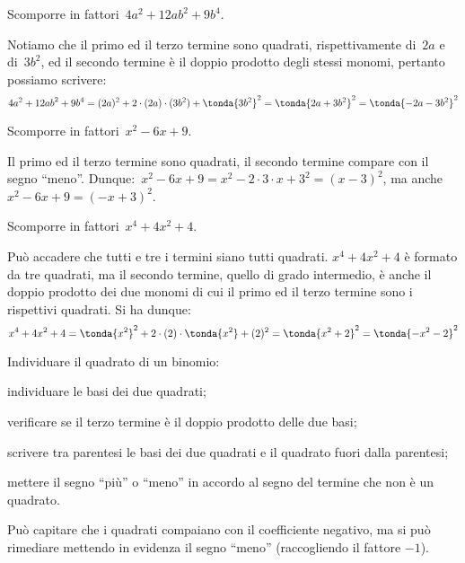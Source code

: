  \begin{esempio}
Scomporre in fattori~\(4a^{2}+12ab^{2}+9b^{4}\).

Notiamo che il primo ed il terzo termine sono quadrati, rispettivamente 
di~\(2a\) e di~\(3b^{2}\), ed il secondo termine è il doppio prodotto degli 
stessi 
monomi, pertanto possiamo scrivere:
\[4a^{2}+12{ab}^{2}+9b^{4}=(2a)^{2}+2 \cdot (2a) \cdot (3b^{2})+
  \tonda{3b^{2}}^{2}=\tonda{2a+3b^{2}}^{2}=\tonda{-2a-3b^{2}}^{2}\]
 \end{esempio}

 \begin{esempio}
Scomporre in fattori~\(x^2-6x+9\).

Il primo ed il terzo termine sono quadrati, il secondo termine compare con il 
segno ``meno''.
Dunque:~\(x^2-6x+9=x^2-2\cdot 3\cdot x+3^{2}=(x-3)^{2}\), 
ma anche~\(x^2-6x+9=(-x+3)^{2}\).
 \end{esempio}

 \begin{esempio}
Scomporre in fattori~\(x^4+4x^2+4\).

Può accadere che tutti e tre i termini siano tutti quadrati. 
\(x^4+4x^2+4\) è formato da tre quadrati, ma il secondo termine, quello 
di grado intermedio, è anche il doppio prodotto dei due monomi di cui il 
primo ed il terzo termine sono i rispettivi quadrati.
Si ha dunque:
\[x^4+4x^2+4=
  \tonda{x^2}^{2}+2 \cdot (2) \cdot \tonda{x^2}+(2)^{2}=
  \tonda{x^2+2}^{2}=\tonda{-x^2-2}^{2}\]
 \end{esempio}

\begin{procedura}
Individuare il quadrato di un binomio:
\begin{enumeratea}
\item individuare le basi dei due quadrati;
\item verificare se il terzo termine è il doppio prodotto delle due basi;
\item scrivere tra parentesi le basi dei due quadrati e il quadrato fuori 
 dalla parentesi;
\item mettere il segno ``più'' o ``meno'' in accordo al segno del termine che 
 non è un quadrato.
\end{enumeratea}
\end{procedura}

Può capitare che i quadrati compaiano con il coefficiente negativo, ma si può 
rimediare mettendo in evidenza il segno ``meno'' (raccogliendo il fattore 
\(-1\)).

